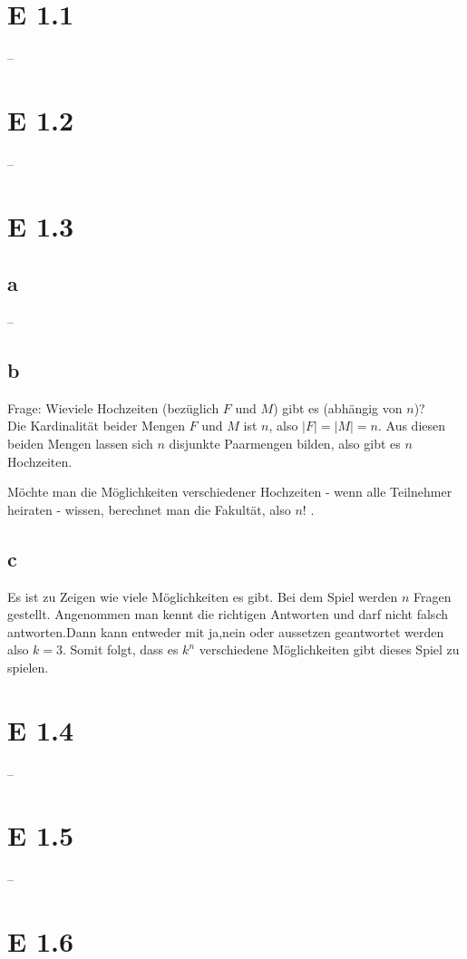 \documentclass[12pt]{article}
\begin{document}
\section{E 1.1}
--

\section{E 1.2}
--

\section{E 1.3}
\subsection{a}
--
\subsection{b}
Frage: Wieviele Hochzeiten (bezüglich $F$ und $M$) gibt es (abhängig von $n$)? \\

Die Kardinalität beider Mengen $F$ und $M$ ist $n$, also $|F| =|M| = n$. Aus diesen beiden Mengen
lassen sich $n$ disjunkte Paarmengen bilden, also gibt es $n$ Hochzeiten.


Möchte man die Möglichkeiten verschiedener Hochzeiten - wenn alle Teilnehmer heiraten -
 wissen, berechnet man die Fakultät, also $n!$ .

\subsection{c}
Es ist zu Zeigen wie viele Möglichkeiten es gibt. Bei dem Spiel werden $n$ Fragen gestellt. Angenommen
man kennt die richtigen Antworten und darf nicht falsch antworten.Dann kann entweder mit ja,nein oder
aussetzen geantwortet werden also $k=3$. Somit folgt, dass es $k^n$ verschiedene Möglichkeiten gibt dieses
Spiel zu spielen. 

\section{E 1.4}
--

\section{E 1.5}
--


\section{E 1.6}
\end{document}
